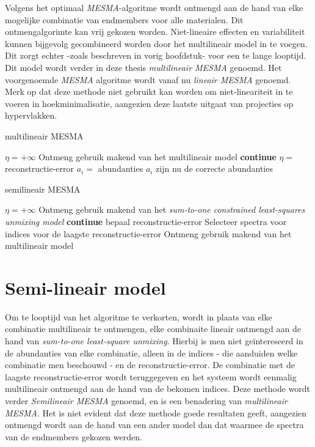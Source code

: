 \documentclass[12pt]{report}
\begin{document}
Volgens het optimaal \textit{MESMA}-algoritme wordt ontmengd aan de hand van elke mogelijke combinatie van endmembers voor alle materialen. Dit ontmengalgorimte kan vrij gekozen worden. Niet-lineaire effecten en variabiliteit kunnen bijgevolg gecombineerd worden door het multilineair model in te voegen. Dit zorgt echter -zoals beschreven in vorig hoofdstuk- voor een te lange looptijd. Dit model wordt verder in deze thesis \textit{multilineair MESMA} genoemd. Het voorgenoemde \textit{MESMA} algoritme wordt vanaf nu \textit{lineair MESMA} genoemd. Merk op dat deze methode niet gebruikt kan worden om niet-lineariteit in te voeren in hoekminimalisatie, aangezien deze laatste uitgaat van projecties op hypervlakken.

\begin{algorithm}
\caption{multilineair MESMA\label{al:mmesma}}
\begin{algorithmic}[1]
\State $\eta = +\infty$ 
\State Ontmeng gebruik makend van het multilineair model
\State \textbf{continue}
\EndIf
{}
\State $\eta = $ reconstructie-error
\State $a_i = $ abundanties
\EndIf
\EndFor
\EndFor
\State $a_i$ zijn nu de correcte abundanties
\end{algorithmic}
\end{algorithm}

\begin{algorithm}
\caption{semilineair MESMA\label{al:smesma}}
\begin{algorithmic}[1]
\State $\eta = +\infty$ 
\State Ontmeng gebruik makend van het \textit{sum-to-one constrained least-squares unmixing model}
\State \textbf{continue}
\State bepaal reconstructie-error
\EndIf
\EndFor
\EndFor
\State Selecteer spectra voor indices voor de laagste reconstructie-error
\State Ontmeng gebruik makend van het multilineair model 
\end{algorithmic}
\end{algorithm}


\section{Semi-lineair model} \label{sec:smesma}

Om te looptijd van het algoritme te verkorten, wordt in plaats van elke combinatie multilineair te ontmengen, elke combinaite lineair ontmengd aan de hand van \textit{sum-to-one least-square unmixing}. Hierbij is men niet ge\"intereseerd in de abundanties van elke combinatie, alleen in de indices - die aanduiden welke combinatie men beschouwd - en de reconstructie-error. De combinatie met de laagste reconstructie-error wordt teruggegeven en het systeem wordt eenmalig multilineair ontmengd aan de hand van de bekomen indices. Deze methode wordt verder \textit{Semilineair MESMA} genoemd, en is een benadering van \textit{multilineair MESMA}. Het is niet evident dat deze methode goede resultaten geeft, aangezien ontmengd wordt aan de hand van een ander model dan dat waarmee de spectra van de endmembers gekozen werden.
\end{document}
